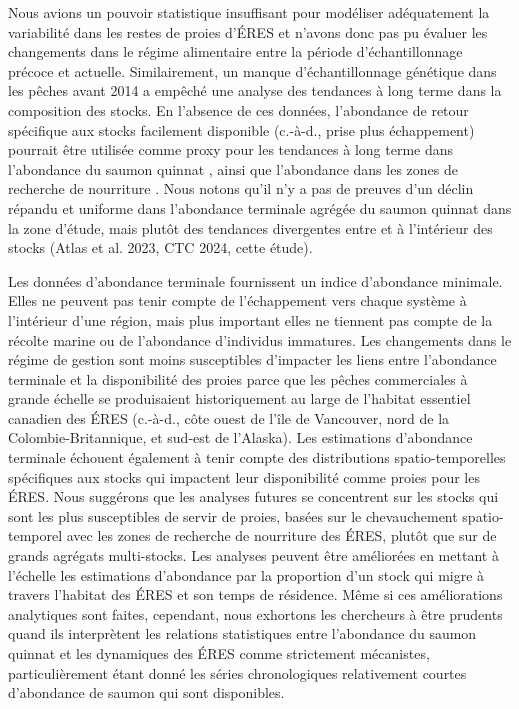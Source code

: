 Nous avions un pouvoir statistique insuffisant pour modéliser adéquatement la variabilité dans les restes de proies d'ÉRES et n'avons donc pas pu évaluer les changements dans le régime alimentaire entre la période d'échantillonnage précoce et actuelle. Similairement, un manque d'échantillonnage génétique dans les pêches avant 2014 a empêché une analyse des tendances à long terme dans la composition des stocks. En l'absence de ces données, l'abondance de retour spécifique aux stocks facilement disponible (c.-à-d., prise plus échappement) pourrait être utilisée comme proxy pour les tendances à long terme dans l'abondance du saumon quinnat \citep[p. ex.,][]{atlasTrendsChinookSalmon2023}, ainsi que l'abondance dans les zones de recherche de nourriture \citep[p. ex.,][]{wardQuantifyingEffectsPrey2009, nelsonIdentifyingDriversDemographic2024}. Nous notons qu'il n'y a pas de preuves d'un déclin répandu et uniforme dans l'abondance terminale agrégée du saumon quinnat dans la zone d'étude, mais plutôt des tendances divergentes entre et à l'intérieur des stocks (Atlas et al. 2023, CTC 2024, cette étude).

Les données d'abondance terminale fournissent un indice d'abondance minimale. Elles ne peuvent pas tenir compte de l'échappement vers chaque système à l'intérieur d'une région, mais plus important elles ne tiennent pas compte de la récolte marine ou de l'abondance d'individus immatures. Les changements dans le régime de gestion sont moins susceptibles d'impacter les liens entre l'abondance terminale et la disponibilité des proies parce que les pêches commerciales à grande échelle se produisaient historiquement au large de l'habitat essentiel canadien des ÉRES (c.-à-d., côte ouest de l'île de Vancouver, nord de la Colombie-Britannique, et sud-est de l'Alaska). Les estimations d'abondance terminale échouent également à tenir compte des distributions spatio-temporelles spécifiques aux stocks qui impactent leur disponibilité comme proies pour les ÉRES. Nous suggérons que les analyses futures se concentrent sur les stocks qui sont les plus susceptibles de servir de proies, basées sur le chevauchement spatio-temporel avec les zones de recherche de nourriture des ÉRES, plutôt que sur de grands agrégats multi-stocks. Les analyses peuvent être améliorées en mettant à l'échelle les estimations d'abondance par la proportion d'un stock qui migre à travers l'habitat des ÉRES et son temps de résidence. Même si ces améliorations analytiques sont faites, cependant, nous exhortons les chercheurs à être prudents quand ils interprètent les relations statistiques entre l'abondance du saumon quinnat et les dynamiques des ÉRES comme strictement mécanistes, particulièrement étant donné les séries chronologiques relativement courtes d'abondance de saumon qui sont disponibles.

